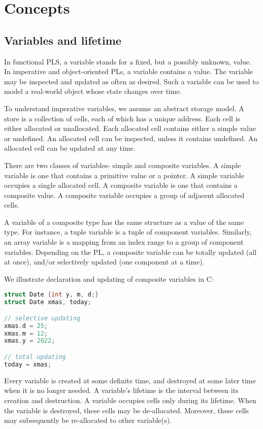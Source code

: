 \documentclass[a4paper, openany]{memoir}
\begin{document}
\chapter{Concepts}

\section{Variables and lifetime}
In functional PLS, a variable stands for a fixed, but a possibly unknown, value. In imperative and object-oriented PLs, a variable contains a value. The variable may be inspected and updated as often as desired. Such a variable can be used to model a real-world object whose state changes over time.

To understand imperative variables, we assume an abstract storage model. A store is a collection of cells, each of which has a unique address. Each cell is either allocated or unallocated. Each allocated cell contains either a simple value or undefined. An allocated cell can be inspected, unless it contains undefined. An allocated cell can be updated at any time.

There are two classes of variables- simple and composite variables. A simple variable is one that contains a primitive value or a pointer. A simple variable occupies a single allocated cell. A composite variable is one that contains a composite value. A composite variable occupies a group of adjacent allocated cells.

A variable of a composite type has the same structure as a value of the same type. For instance, a tuple variable is a tuple of component variables. Similarly, an array variable is a mapping from an index range to a group of component variables. Depending on the PL, a composite variable can be totally updated (all at once), and/or selectively updated (one component at a time).

We illustrate declaration and updating of composite variables in C:
\begin{lstlisting}[language=C]
struct Date {int y, m, d;}
struct Date xmas, today;

// selective updating
xmas.d = 25;
xmas.m = 12;
xmas.y = 2022;

// total updating
today = xmas;
\end{lstlisting}

Every variable is created at some definite time, and destroyed at some later time when it is no longer needed. A variable's lifetime is the interval between its creation and destruction. A variable occupies cells only during its lifetime. When the variable is destroyed, these cells may be de-allocated. Moreover, these cells may subsequently be re-allocated to other variable(s).
\end{document}
